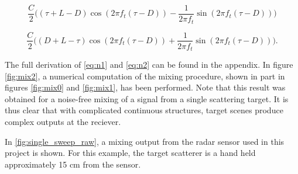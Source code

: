 \begin{equation}\label{eq:n1}
	\frac{C}{2}\Big((\tau + L - D)\cos(2\pi f_t(\tau - D)) 
	- \frac{1}{2\pi f_t}\sin(2\pi f_t(\tau - D))\Big)
\end{equation}

\begin{equation}\label{eq:n2}
	\frac{C}{2}\Big((D + L - \tau)\cos(2\pi f_t(\tau - D)) 
	+ \frac{1}{2\pi f_t}\sin(2\pi f_t(\tau - D))\Big).
\end{equation}

The full derivation of \ref{eq:n1} and \ref{eq:n2} can be found in the appendix. In figure \ref{fig:mix2}, a numerical computation of the mixing procedure, shown in part in figures \ref{fig:mix0} and \ref{fig:mix1}, has been performed. Note that this result was obtained for a noise-free mixing of a signal from a single scattering target. It is thus clear that with complicated continuous structures, target scenes produce complex outputs at the reciever. 

In \ref{fig:single_sweep_raw}, a mixing output from the radar sensor used in this project is shown. For this example, the target scatterer is a hand held approximately 15 cm from the sensor. 










